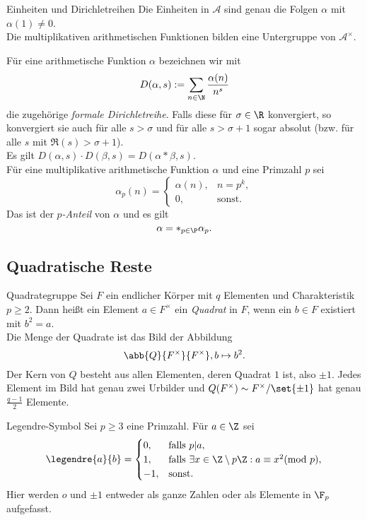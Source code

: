 \begin{karte}{Einheiten und Dirichletreihen}
    Die Einheiten in \(\mathcal{A}\) sind genau die Folgen \(\alpha\) mit 
    \(\alpha(1) \neq 0\). \\
    Die multiplikativen arithmetischen Funktionen bilden eine Untergruppe 
    von \(\mathcal{A}^\times\).

    Für eine arithmetische Funktion \(\alpha\) bezeichnen wir mit 
    \[ D(\alpha, s) := \sum_{n\in \N} \frac{\alpha(n)}{n^s} \]
    die zugehörige \textit{formale Dirichletreihe}. Falls diese für 
    \(\sigma \in \R\) konvergiert, so konvergiert sie auch für alle \(s> \sigma\) 
    und für alle \(s>\sigma + 1\) sogar absolut (bzw. für alle \(s\) mit \(\Re(s)>\sigma + 1\)).\\
    Es gilt \(D(\alpha, s) \cdot D(\beta, s) = D(\alpha * \beta, s)\).\\

    Für eine multiplikative arithmetische Funktion \(\alpha\) und eine 
    Primzahl \(p\) sei 
    \[ \alpha_p(n) = \begin{cases}
        \alpha(n), &n=p^k, \\
        0, &\text{sonst}.
    \end{cases} \]
    Das ist der \textit{\(p\)-Anteil} von \(\alpha\)
    und es gilt \[ \alpha = *_{p\in \P}\alpha_p. \]
\end{karte}

\subsection{Quadratische Reste}

\begin{karte}{Quadrategruppe}
    Sei \(F\) ein endlicher Körper mit \(q\) Elementen und Charakteristik 
    \(p\geq 2\). Dann heißt ein Element \( a\in F^\times \) ein \textit{Quadrat} 
    in \(F\), wenn ein \(b\in F\) existiert mit \(b^2 = a\). \\
    Die Menge der Quadrate ist das Bild der Abbildung 
    \[ \abb{Q}{F^\times}{F^\times}, b\mapsto b^2. \]
    Der Kern von \(Q\) besteht aus allen Elementen, deren Quadrat \(1\) ist, also \(\pm 1\). 
    Jedes Element im Bild hat genau zwei Urbilder und \(Q(F^\times) \sim F^\times / \set{\pm 1}\)
    hat genau \(\frac{q-1}{2}\) Elemente.
\end{karte}

\begin{karte}{Legendre-Symbol}
    Sei \(p\geq 3\) eine Primzahl. Für \(a\in \Z\) sei 
    \[ \legendre{a}{b} = \begin{cases}
        0, &\text{falls } p | a, \\
        1, &\text{falls } \exists x\in \Z \setminus p\Z: a \equiv x^2 (\mathrm{mod}\ p), \\
        -1, &\text{sonst.}
    \end{cases} \]
    Hier werden \(o\) und \(\pm 1\) entweder als ganze Zahlen oder als Elemente in 
    \(\F_p\) aufgefasst. 
\end{karte}

